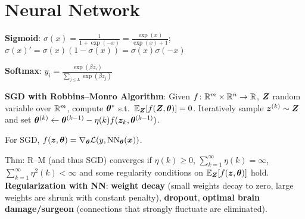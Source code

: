 \section{Neural Network}



\textbf{Sigmoid}:
$\sigma(x) = \frac{1}{1+\exp(-x)} = \frac{\exp(x)}{\exp(x) + 1}$;\\
$\sigma(x)' = \sigma(x)(1-\sigma(x)) = \sigma(x)\sigma(-x)$

\textbf{Softmax}: $y_i=\frac{\exp(\beta z_i)}{\sum_{j\leq L}\exp(\beta z_j)}$

\textbf{SGD with Robbins--Monro Algorithm}:
Given $f \colon \mathbb R^m \times \mathbb R^n \rightarrow \mathbb R$, $\boldsymbol{Z}$ random variable over $\mathbb R^m$,
compute $\boldsymbol{\theta}^*$ s.t.\ $\mathbb E_{\boldsymbol{Z}}[f(\boldsymbol{Z}, \boldsymbol{\theta})] = 0$.
Iteratively sample $\boldsymbol{z}^{(k)} \sim \boldsymbol{Z}$
and set $\boldsymbol{\theta}^{(k)} \leftarrow \boldsymbol{\theta}^{(k-1)} - \eta(k) f(\boldsymbol{z}_k, \boldsymbol{\theta}^{(k-1)})$.

For SGD, $f(\boldsymbol{z}, \boldsymbol{\theta}) = \nabla_{\boldsymbol{\theta}} \mathcal{L}(y, \operatorname{NN}_{\boldsymbol{\theta}}(\boldsymbol{x}))$.

Thm: R--M (and thus SGD) converges if
$\eta(k) \geq 0$,
$\sum_{k=1}^\infty \eta(k) = \infty$,
$\sum_{k=1}^\infty \eta^2(k) < \infty$
and some regularity conditions on $\mathbb E_{\boldsymbol{Z}}[f(\boldsymbol{z}, \boldsymbol{\theta})]$ hold.\\

\textbf{Regularization with NN}: \textbf{weight decay} (small weights decay to zero, large weights are shrunk with constant penalty), \textbf{dropout}, \textbf{optimal brain damage/surgeon} (connections that strongly fluctuate are eliminated).

